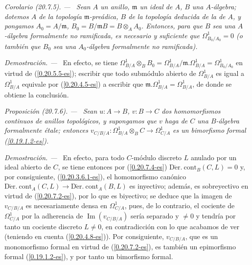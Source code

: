 \documentclass[10pt,oneside]{book}
\makeatletter
\newcommand{\sref}[1]{\textup{(\ref{#1})}}
\newcommand{\setmanualcurrentlabel}[1]{\def\@currentlabel{#1}}
\newcommand{\oldpage}[2][]{%
  \setcounter{footnote}{0}%
  \marginpar{\scriptsize\textbf{#1}~|~#2}\ignorespaces}
\newenvironment{proposition}[1][]{%
  \setmanualcurrentlabel{#1}\par\medskip\noindent\itshape Proposición (#1). ---\ }{\par}
\newenvironment{corollary}[1][]{%
  \setmanualcurrentlabel{#1}\par\medskip\noindent\itshape Corolario (#1). ---\ }{\par}
\newenvironment{proof}{%
  \par\medskip\noindent\textit{Demostración. ---\ }}{\par}
\makeatother
\begin{document}
\begin{corollary}[20.7.5]
\label{0.20.7.5-es}
Sean $A$ un anillo, $\mathfrak{m}$ un ideal de $A$, $B$ una $A$-álgebra;
dotemos $A$ de la topología $\mathfrak{m}$-preádica, $B$ de la topología
deducida de la de $A$, y pongamos $A_0=A/\mathfrak{m}$,
$B_0=B/\mathfrak{m}B=B\otimes_A A_0$. Entonces, para que $B$ sea una
$A$-álgebra formalmente no ramificada, es necesario y suficiente que
$\Omega^1_{B_0/A_0}=0$ \textup{(o también que $B_0$ sea una} $A_0$-álgebra
formalmente no ramificada).
\end{corollary}

\begin{proof}
En efecto, se tiene
$\Omega^1_{B/A}\otimes_B B_0=\Omega^1_{B/A}/\mathfrak{m}.\Omega^1_{B/A}
=\Omega^1_{B_0/A_0}$ en virtud de \sref{0.20.5.5-es}; escribir que todo
submódulo abierto de $\Omega^1_{B/A}$ es igual a $\Omega^1_{B/A}$ equivale
por \sref{0.20.4.5-es} a escribir que
$\mathfrak{m}.\Omega^1_{B/A}=\Omega^1_{B/A}$, de donde se obtiene la conclusión.
\end{proof}

\begin{proposition}[20.7.6]
\label{0.20.7.6-es}
Sean $u:A\to B$, $v:B\to C$ dos homomorfismos continuos de anillos
topológicos, y supongamos que $v$ haga de $C$ una $B$-álgebra formalmente
étale; entonces $v_{C/B/A}:\Omega^1_{B/A}\otimes_B C\to\Omega^1_{C/A}$ es un
bimorfismo formal \textup{\sref{0.19.1.2-es}}.
\end{proposition}

\begin{proof}
En efecto, para todo $C$-módulo discreto $L$ anulado por un ideal abierto de $C$,
se tiene entonces por \sref{0.20.7.4-es}
$\operatorname{D\acute{e}r.\ cont}_B(C,L)=0$ y, por consiguiente,
\sref{0.20.3.6.1-es}, el homomorfismo canónico
\oldpage[0\textsubscript{IV-1}]{149}
$\operatorname{D\acute{e}r.\ cont}_A(C,L)\to
\operatorname{D\acute{e}r.\ cont}_A(B,L)$ es inyectivo; además, es
sobreyectivo en virtud de \sref{0.20.7.2-es}, por lo que es biyectivo; se deduce
que la imagen de $v_{C/B/A}$ es necesariamente densa en $\Omega^1_{C/A}$,
pues, de lo contrario, el cociente de $\Omega^1_{C/A}$ por la adherencia de
$\operatorname{Im}(v_{C/B/A})$ sería separado y $\neq0$ y tendría por tanto un
cociente discreto $L\neq0$, en contradicción con lo que acabamos de ver
(teniendo en cuenta \sref{0.20.4.8-es}). Por consiguiente, $v_{C/B/A}$, que es un
monomorfismo formal en virtud de \sref{0.20.7.2-es}, es también un epimorfismo formal
\sref{0.19.1.2-es}, y por tanto un bimorfismo formal.
\end{proof}
\end{document}
